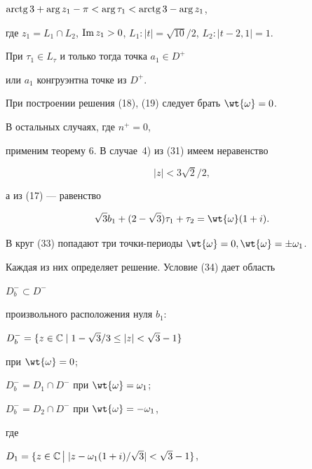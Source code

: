 $\arctg 3 +\arg z_1 - \pi< \arg \tau_1 <


\arctg 3 -\arg z_1$,


где $z_1 = L_1 \cap L_2$, $\im z_1 >0$, $L_1:


|t|=\sqrt{10}/2$, $L_2:|t-2,1| = 1$.


При $\tau_1 \in L_{\tau}$ и только тогда точка $a_1 \in D^{+} $


или $a_1$ конгруэнтна точке из $D^+$.


При построении решения (18), (19) следует брать $\wt{\omega}=0$.





В остальных случаях, где $n^+ =0$,


применим теорему 6. В случае~4) из (31) имеем неравенство


\begin{equation}


|z| < 3\sqrt{2}/2,


\end{equation}


а из (17) --- равенство


\begin{equation}


\sqrt{3}b_{1}+(2-\sqrt{3})\tau_1 +\tau_2 =\wt{\omega}(1+i).


\end{equation}


В круг (33) попадают три точки-периоды $\wt{\omega} =0,


\wt{\omega}=\pm \omega_1$.


Каждая из них определяет решение. Условие (34) дает область


$D^{-}_{b} \subset D^{-} $


произвольного расположения нуля $b_1$:





$D^{-}_{b} = \{ z\in \Bbb C\mid 1-\sqrt{3}/3\le|z| < \sqrt{3}-1 \}$


при $\wt{\omega}= 0$;





$D^{-}_{b}=D_{1}\cap D^{-}$ при $\wt{\omega}=\omega_1$;


$D^{-}_{b}=D_{2}\cap D^{-}$ при $\wt{\omega}=-\omega_1$,


где





$D_{1}=\{ z\in\Bbb C\,\big|\; |z-\omega_{1}(1+i)/\sqrt{3}|<\sqrt{3}-1 \}$,


